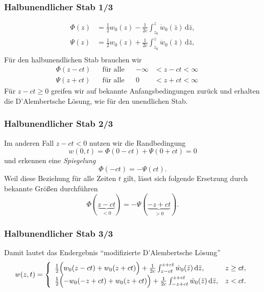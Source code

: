 \documentclass[hyperref={pdfpagemode=FullScreen, colorlinks=false}]{beamer}
\begin{document}
\begin{frame}
\hspace{1cm} \frametitle{Halbunendlicher Stab 1/3}

\begin{align*}
 \Phi(z)&=\frac{1}{2}w_0(z)-\frac{1}{2c} \int_{z_0}^z  \dot{w}_0(\bar{z})\,\mathrm{d}\bar{z},\\
 \Psi(z)&=\frac{1}{2}w_0(z)+\frac{1}{2c} \int_{z_0}^z  \dot{w}_0(\bar{z})\,\mathrm{d}\bar{z},\\
\end{align*}
Für den halbunendlichen Stab brauchen wir
\begin{align*}
 \Phi(z-ct) & &\text{für alle}& &-\infty &< z-ct < \infty & &\\ %
 \Psi(z+ct) & &\text{für alle}& & 0 &< z+ct < \infty & &%
\end{align*}
Für $z-ct\ge 0$ greifen wir auf bekannte Anfangsbedingungen zurück und erhalten die D'Alembertsche Lösung, wie für den unendlichen Stab.
\end{frame} 

\begin{frame}
\frametitle{Halbunendlicher Stab 2/3}
Im anderen Fall $z-ct<0$ nutzen wir die Randbedingung 
\begin{equation*}
 w(0,t)=\Phi(0-ct)+\Psi(0+ct)=0
\end{equation*}
und erkennen eine \textsl{Spiegelung}
\begin{equation*}
 \Phi(-ct)=-\Psi(ct).
\end{equation*}
Weil diese Beziehung für alle Zeiten $t$ gilt, lässt sich folgende Ersetzung durch bekannte Größen durchführen
\begin{equation*}
\Phi(\underbrace{z-ct}_{<0})=-\Psi(\underbrace{-z+ct}_ {>0}). 
\end{equation*}
\end{frame}

\begin{frame}
\frametitle{Halbunendlicher Stab 3/3}
Damit lautet das Endergebnis ``modifizierte D'Alembertsche Lösung''
\begin{equation*}
 w(z,t)=\left\{ \begin{array}{ll}
                 \frac{1}{2}\Bigl( w_0(z-ct) + w_0(z+ct) \Bigr)+\frac{1}{2c} \int_{z-ct}^{z+ct}  \dot{w}_0(\bar{z})\,\mathrm{d}\bar{z}, & z \ge ct, \\
                 \frac{1}{2}\Bigl( -w_0(-z+ct) + w_0(z+ct) \Bigr)+\frac{1}{2c} \int_{-z+ct}^{z+ct}  \dot{w}_0(\bar{z})\,\mathrm{d}\bar{z}, & z < ct. 
                \end{array}
  \right.
\end{equation*}

\end{frame}
\end{document}
